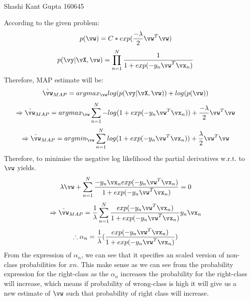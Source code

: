 \documentclass[a4paper,11pt]{article}
\begin{document}
{Shashi Kant Gupta}   %
{160645}	%

\begin{mlsolution}
\noindent
According to the given problem:
\begin{equation}
  p(\vw) = C*exp(\frac{-\lambda}{2}\vw^{T}\vw)
\end{equation}
\begin{equation}
  p(\vy|\vX, \vw) = \prod_{n=1}^{N}\frac{1}{1 + exp(-y_{n}\vw^{T}\vx_{n})}
\end{equation}
Therefore, MAP estimate will be:
\begin{equation}
  \hat\vw_{MAP} = argmax_{\vw}log(p(\vy|\vX, \vw)) + log(p(\vw))
\end{equation}
\begin{equation}
  \Rightarrow \hat\vw_{MAP} = argmax_{\vw}\sum_{n=1}^{N}-log(1 + exp(-y_{n}\vw^{T}\vx_{n})) + \frac{-\lambda}{2}\vw^{T}\vw
\end{equation}
\begin{equation}
  \Rightarrow \hat\vw_{MAP} = argmin_{\vw}\sum_{n=1}^{N}log(1 + exp(-y_{n}\vw^{T}\vx_{n})) + \frac{\lambda}{2}\vw^{T}\vw
\end{equation}
Therefore, to minimise the negative log likelihood the partial derivatives w.r.t. to $\vw$ yields.
\begin{equation}
  \lambda\vw + \sum_{n=1}^{N}\frac{-y_{n}\vx_{n}exp(-y_{n}\vw^{T}\vx_{n})}{1 + exp(-y_{n}\vw^{T}\vx_{n})} = 0
\end{equation}
\begin{equation}
  \Rightarrow \hat\vw_{MAP} = \frac{1}{\lambda}\sum_{n=1}^{N}\frac{exp(-y_{n}\vw^{T}\vx_{n})}{1 + exp(-y_{n}\vw^{T}\vx_{n})}y_{n}\vx_{n}
\end{equation}
\begin{equation}
  \therefore \alpha_{n} = \frac{1}{\lambda}(\frac{exp(-y_{n}\vw^{T}\vx_{n})}{1 + exp(-y_{n}\vw^{T}\vx_{n})})
\end{equation}
From the expression of $\alpha_{n}$, we can see that it specifies an scaled version of non-class probabilities for $x{n}$. This make sense as we can see from the probability expression for the right-class as the $\alpha_{n}$ increases the probability for the right-class will increase, which means if probability of wrong-class is high it will give us a new estimate of $\vw$ such that probability of right class will increase.

\end{mlsolution}
\end{document}
